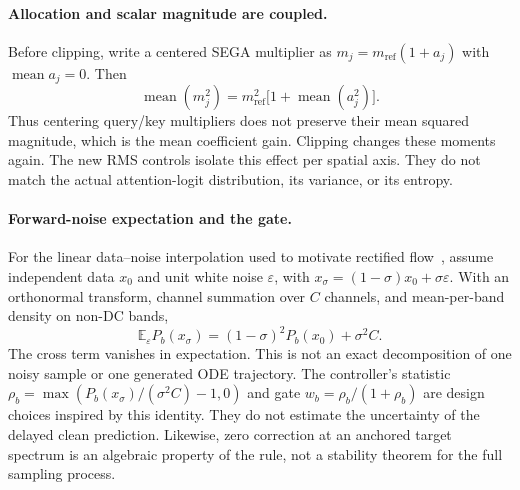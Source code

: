 \paragraph{Allocation and scalar magnitude are coupled.}
Before clipping, write a centered SEGA multiplier as
$m_j=m_{\mathrm{ref}}(1+a_j)$ with $\operatorname{mean}a_j=0$. Then
\begin{equation}
 \operatorname{mean}(m_j^2)
 =m_{\mathrm{ref}}^2\bigl[1+\operatorname{mean}(a_j^2)\bigr].
\end{equation}
Thus centering query/key multipliers does not preserve their mean squared
magnitude, which is the mean coefficient gain. Clipping changes these moments
again. The new RMS controls isolate this effect per spatial axis. They do not
match the actual attention-logit distribution, its variance, or its entropy.

\paragraph{Forward-noise expectation and the gate.}
For the linear data--noise interpolation used to motivate rectified
flow~\citep{liu2023flow}, assume independent data $x_0$ and unit white noise
$\varepsilon$, with $x_\sigma=(1-\sigma)x_0+\sigma\varepsilon$.
With an orthonormal transform, channel summation over $C$ channels, and
mean-per-band density on non-DC bands,
\begin{equation}
 \mathbb{E}_{\varepsilon} P_b(x_\sigma)
 =(1-\sigma)^2P_b(x_0)+\sigma^2C.
\end{equation}
The cross term vanishes in expectation. This is not an exact decomposition of
one noisy sample or one generated ODE trajectory. The controller's statistic
$\rho_b=\max(P_b(x_\sigma)/(\sigma^2C)-1,0)$ and gate
$w_b=\rho_b/(1+\rho_b)$ are design choices inspired by this identity. They do
not estimate the uncertainty of the delayed clean prediction. Likewise, zero
correction at an anchored target spectrum is an algebraic property of the
rule, not a stability theorem for the full sampling process.
